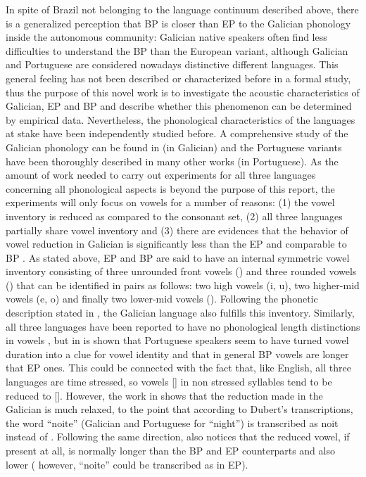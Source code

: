 \documentclass[a4paper,11pt]{article}
\begin{document}
    
    In spite of Brazil not belonging to the language continuum described above, there is a generalized perception that BP is closer than EP  to the Galician phonology inside the autonomous community: Galician native speakers often find less difficulties to understand the BP than the European variant, although Galician and Portuguese are considered nowadays distinctive different languages. This general feeling has not been described or characterized before in a formal study, thus the purpose of this novel work is to investigate the acoustic characteristics of Galician, EP and BP and describe whether this phenomenon can be determined by empirical data. Nevertheless, the phonological characteristics of the languages at stake have been independently studied before. A comprehensive study of the Galician phonology can be found in \cite{blancoo} (in Galician) and the Portuguese variants have been thoroughly described in many other works \cite{camara,delgado,matos} (in Portuguese). As the amount of work needed to carry out experiments for all three languages concerning all phonological aspects is beyond the purpose of this report, the experiments will only focus on vowels for a number of reasons: (1) the vowel inventory is reduced as compared to the consonant set, (2) all three languages partially share  vowel inventory \cite{moraes,barroso} and (3) there are evidences that the behavior of vowel reduction in Galician is significantly less than the EP and comparable to BP \cite{figueiroa,regueira}. As stated above, EP and BP are said to have an internal symmetric vowel inventory consisting of three unrounded front vowels () and three rounded vowels () that can be identified in pairs as follows: two high vowels (i, u), two higher-mid vowels (e, o) and finally two lower-mid vowels (). Following the phonetic description stated in \cite{blancoo}, the Galician language also fulfills this inventory. Similarly, all three languages have been reported to have no phonological length distinctions in vowels \cite{mateus}, but in \cite{escudero} is shown that Portuguese speakers seem to have turned vowel duration into a clue for vowel identity and that in general BP vowels are longer that EP ones. This could be connected with the fact that, like English, all three languages are time stressed, so vowels [] in non stressed syllables tend to be reduced to []. However, the work in \cite{dubert} shows that the reduction made in the Galician is much relaxed, to the point that according to Dubert's transcriptions, the word ``noite'' (Galician and Portuguese for ``night'') is transcribed as noit\textipa{[\textraising{e}]} instead of . Following the same direction, \cite{regueira} also notices that the reduced vowel, if present at all, is normally longer than the BP and EP counterparts and also lower ( however, ``noite'' could be transcribed as  in EP). \\
    
\end{document}
